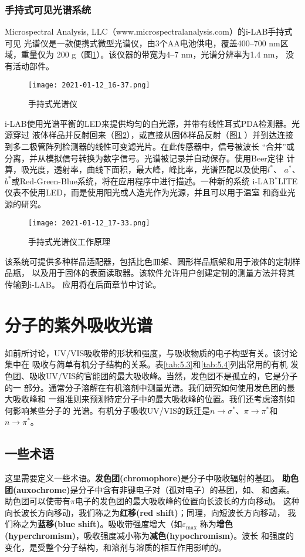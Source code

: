 \subsubsection{手持式可见光谱系统}
Microspectral Analysis, LLC（www.microspectralanalysis.com）的i-LAB手持式可见
光谱仪是一款便携式微型光谱仪，由3个AA电池供电，覆盖400--700 nm区域，重量仅为
200 g（图\ref{fig:5.37}）。该仪器的带宽为4--7 nm，光谱分辨率为1.4 nm，
没有活动部件。
\begin{figure}[htpb]
    \centering
    \texttt{[image: 2021-01-12\_16-37.png]}
    \caption{手持式光谱仪}
    \label{fig:5.37}
\end{figure}

i-LAB使用光谱平衡的LED来提供均匀的白光源，并带有线性耳式PDA检测器。光源穿过
液体样品并反射回来（图\ref{fig:5.38}），或直接从固体样品反射（图\ref{fig:5.37}
）并到达连接到多二极管阵列检测器的线性可变滤光片。在此传感器中，信号被波长
“合并”或分离，并从模拟信号转换为数字信号。光谱被记录并自动保存。使用Beer定律
计算，吸光度，透射率，曲线下面积，最大峰，峰比率，光谱匹配以及使用$l^\ast$、
$a^\ast$、$b^\ast$或Red-Green-Blue系统，将在应用程序中进行描述。一种新的系统
i-LAB$^\ast$LITE仪表不使用LED，而是使用阳光或人造光作为光源，并且可以用于温室
和商业光源的研究。
\begin{figure}[htpb]
    \centering
    \texttt{[image: 2021-01-12\_17-33.png]}
    \caption{手持式光谱仪工作原理}
    \label{fig:5.38}
\end{figure}

该系统可提供多种样品适配器，包括比色皿架、圆形样品瓶架和用于液体的定制样品瓶，
以及用于固体的表面读取器。该软件允许用户创建定制的测量方法并将其传输到i-LAB。
应用将在后面章节中讨论。
\section{分子的紫外吸收光谱}
如前所讨论，UV/VIS吸收带的形状和强度，与吸收物质的电子构型有关。该讨论集中在
吸收与简单有机分子结构的关系。表\ref{tab:5.3}和\ref{tab:5.4}列出常用的有机
发色团、吸收UV/VIS的官能团的最大吸收峰。当然，发色团不是孤立的，它是分子的一
部分。通常分子溶解在有机溶剂中测量光谱。我们研究如何使用发色团的最大吸收峰和
一组准则来预测特定分子中的最大吸收峰的位置。我们还考虑溶剂如何影响某些分子的
光谱。有机分子吸收UV/VIS的跃迁是$n\to\sigma^\ast$、$\pi\to\pi^\ast$和
$n\to\pi^\ast$。
\subsection{一些术语}
这里需要定义一些术语。{\bf 发色团(chromophore)}是分子中吸收辐射的基团。{\bf 
助色团(auxochrome)}是分子中含有非键电子对（孤对电子）的基团，如、
和卤素。助色团可以使带有$\pi$电子的发色团的最大吸收峰的位置向长波长的方向移动。
这种向长波长方向移动，我们称之为{\bf 红移(red shift)}；同理，向短波长方向移动，
我们称之为{\bf 蓝移(blue shift)}。吸收带强度增大（如$\varepsilon_{\text{max}}$
称为{\bf 增色(hyperchromism)}，吸收强度减小称为{\bf 减色(hypochromism)}。波长
和强度的变化，是受整个分子结构，和溶剂与溶质的相互作用影响的。

